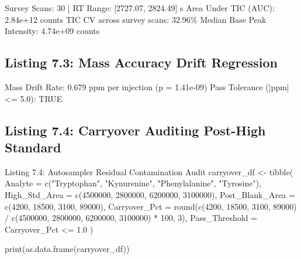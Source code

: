 \documentclass[11pt,twoside,openright]{book}
\begin{document}
\begin{routput}
Survey Scans: 30 | RT Range: [2727.07, 2824.49] s
Area Under TIC (AUC): 2.84e+12 counts
TIC CV across survey scans: 32.96\%
Median Base Peak Intensity: 4.74e+09 counts
\end{routput}

\subsection{Listing 7.3: Mass Accuracy Drift Regression}


\begin{routput}
Mass Drift Rate: 0.679 ppm per injection (p = 1.41e-09)
Pass Tolerance (|ppm| <= 5.0): TRUE
\end{routput}

\subsection{Listing 7.4: Carryover Auditing Post-High Standard}

\begin{rchunk}{Listing 7.4: Autosampler Residual Contamination Audit}
carryover_df <- tibble(
  Analyte         = c("Tryptophan", "Kynurenine", "Phenylalanine", "Tyrosine"),
  High_Std_Area   = c(4500000, 2800000, 6200000, 3100000),
  Post_Blank_Area = c(4200, 18500, 3100, 89000),
  Carryover_Pct   = round(c(4200, 18500, 3100, 89000) / c(4500000, 2800000, 6200000, 3100000) * 100, 3),
  Pass_Threshold  = Carryover_Pct <= 1.0
)

print(as.data.frame(carryover_df))
\end{rchunk}
\end{document}
